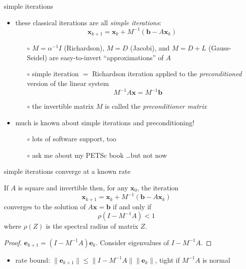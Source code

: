 \documentclass[usepdftitle=false,usenames,dvipsnames]{beamer}
\newcommand{\bb}{\mathbf{b}}
\newcommand{\be}{\mathbf{e}}
\newcommand{\bx}{\mathbf{x}}
\begin{document}
\begin{frame}{simple iterations}

\begin{itemize}
\item these classical iterations are all \alert{\emph{simple iterations}}:
    $$\bx_{k+1} = \bx_k + M^{-1} (\bb - A \bx_k)$$

    \begin{itemize}
    \item[$\circ$] $M=\alpha^{-1} I$ (Richardson), $M=D$ (Jacobi), and $M=D+L$ (Gauss-Seidel) are easy-to-invert ``approximations'' of $A$
    \item[$\circ$] simple iteration $=$ Richardson iteration applied to the \emph{preconditioned} version of the linear system
    $$M^{-1} A \bx = M^{-1} \bb$$
    \item[$\circ$] the invertible matrix $M$ is called the \emph{preconditioner matrix}
    \end{itemize}
\item much is known about simple iterations and preconditioning!
    \begin{itemize}
    \item[$\circ$] lots of software support, too
    \item[$\circ$] ask me about my PETSc book \dots but not now
    \end{itemize}
\end{itemize}
\end{frame}


\begin{frame}{simple iterations converge at a known rate}

\begin{theorem}
If $A$ is square and invertible then, for any $\bx_0$, the iteration
    $$\bx_{k+1} = \bx_k + M^{-1} (\bb - A \bx_k)$$
converges to the solution of $A\bx=\bb$ if and only if
    $$\rho(I - M^{-1}A) < 1$$
where $\rho(Z)$ is the spectral radius of matrix $Z$.
\end{theorem}

\begin{proof}  $\be_{k+1} = (I-M^{-1}A) \be_k$.  Consider eigenvalues of $I-M^{-1}A$. \end{proof}

\begin{itemize}
\item rate bound: $\|\be_{k+1}\| \le \|I-M^{-1}A\| \|\be_k\|$, tight if $M^{-1}A$ is normal
\end{itemize}
\end{frame}
\end{document}
